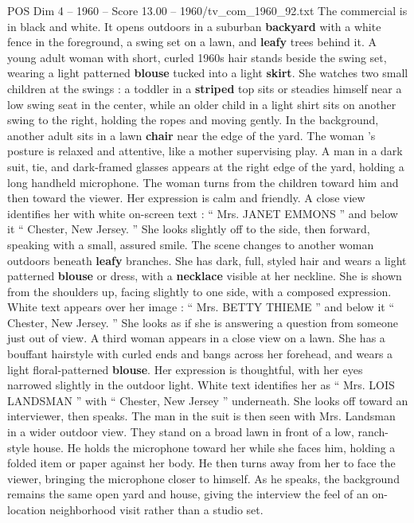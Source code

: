 \begin{textsample}{POS Dim 4 – 1960 – Score 13.00 – 1960/tv\_com\_1960\_92.txt}  \label{ex:f4_pos_069}
The commercial is in black and white.
It opens outdoors in a suburban \textbf{backyard} with a white fence in the foreground, a swing set on a lawn, and \textbf{leafy} trees behind it.
A young adult woman with short, curled 1960s hair stands beside the swing set, wearing a light patterned \textbf{blouse} tucked into a light \textbf{skirt}.
She watches two small children at the swings : a toddler in a \textbf{striped} top sits or steadies himself near a low swing seat in the center, while an older child in a light shirt sits on another swing to the right, holding the ropes and moving gently.
In the background, another adult sits in a lawn \textbf{chair} near the edge of the yard.
The woman ’s posture is relaxed and attentive, like a mother supervising play.
A man in a dark suit, tie, and dark-framed glasses appears at the right edge of the yard, holding a long handheld microphone.
The woman turns from the children toward him and then toward the viewer.
Her expression is calm and friendly.
A close view identifies her with white on-screen text : “ Mrs.
JANET EMMONS ” and below it “ Chester, New Jersey. ” She looks slightly off to the side, then forward, speaking with a small, assured smile.
The scene changes to another woman outdoors beneath \textbf{leafy} branches.
She has dark, full, styled hair and wears a light patterned \textbf{blouse} or dress, with a \textbf{necklace} visible at her neckline.
She is shown from the shoulders up, facing slightly to one side, with a composed expression.
White text appears over her image : “ Mrs.
BETTY THIEME ” and below it “ Chester, New Jersey. ” She looks as if she is answering a question from someone just out of view.
A third woman appears in a close view on a lawn.
She has a bouffant hairstyle with curled ends and bangs across her forehead, and wears a light floral-patterned \textbf{blouse}.
Her expression is thoughtful, with her eyes narrowed slightly in the outdoor light.
White text identifies her as “ Mrs.
LOIS LANDSMAN ” with “ Chester, New Jersey ” underneath.
She looks off toward an interviewer, then speaks.
The man in the suit is then seen with Mrs.
Landsman in a wider outdoor view.
They stand on a broad lawn in front of a low, ranch-style house.
He holds the microphone toward her while she faces him, holding a folded item or paper against her body.
He then turns away from her to face the viewer, bringing the microphone closer to himself.
As he speaks, the background remains the same open yard and house, giving the interview the feel of an on-location neighborhood visit rather than a studio set.

\end{textsample}
